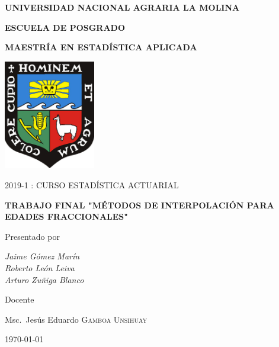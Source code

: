 \begin{titlepage}
	\centering
	{\scshape\LARGE\bfseries UNIVERSIDAD NACIONAL AGRARIA LA MOLINA \par}
	\vspace{0.60cm}	
	{\scshape\large\bfseries ESCUELA DE POSGRADO \par}
	\vspace{0.60cm}	
	{\scshape\large\bfseries MAESTR\'IA EN ESTAD\'ISTICA APLICADA  \par}
	\vspace{0.60cm}	
	
	\includegraphics[width=0.30\textwidth]{img/323x386_ESCUDOCOLOR}\par\vspace{1cm}
	{\scshape\large 2019-1 : CURSO ESTAD\'ISTICA ACTUARIAL\par}
	\vspace{0.60cm}
	{\large\bfseries TRABAJO FINAL "M\'ETODOS DE INTERPOLACI\'ON PARA EDADES FRACCIONALES" \par}
	\vspace{0.60cm}

	\vfill
	Presentado por \par
	{\large\itshape { Jaime G\'omez Mar\'in \\ Roberto Le\'on Leiva \\ Arturo Zu\~niga Blanco}\par}
	\vspace{0.40cm}
	\vfill
	Docente \par
	Msc.~Jes\'us Eduardo \textsc{Gamboa Unsihuay}
	
  \vspace{0.40cm}
	\vfill
	{\large \today\par}
\end{titlepage}
